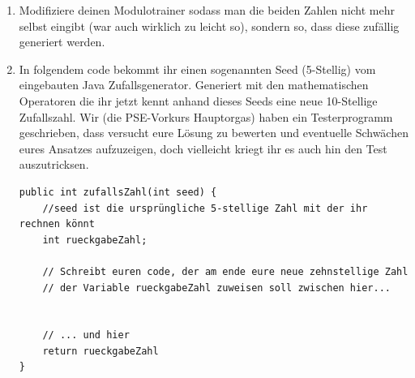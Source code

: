\documentclass{../../sheet}
\begin{document}
\begin{enumerate}
    \item Modifiziere deinen Modulotrainer sodass man die beiden Zahlen nicht mehr selbst eingibt (war auch wirklich zu leicht so), sondern so, dass diese zufällig generiert werden. 
    \item In folgendem code bekommt ihr einen sogenannten Seed (5-Stellig) vom eingebauten Java Zufallsgenerator. Generiert mit den mathematischen Operatoren die ihr jetzt kennt anhand dieses Seeds eine neue 10-Stellige Zufallszahl. Wir (die PSE-Vorkurs Hauptorgas) haben ein Testerprogramm geschrieben, dass versucht eure Lösung zu bewerten und eventuelle Schwächen eures Ansatzes aufzuzeigen, doch vielleicht kriegt ihr es auch hin den Test auszutricksen.
    
    \begin{verbatim}
public int zufallsZahl(int seed) {
    //seed ist die ursprüngliche 5-stellige Zahl mit der ihr rechnen könnt
    int rueckgabeZahl;

    // Schreibt euren code, der am ende eure neue zehnstellige Zahl
    // der Variable rueckgabeZahl zuweisen soll zwischen hier...


    // ... und hier
    return rueckgabeZahl
}
    \end{verbatim}
\end{enumerate}
\end{document}

